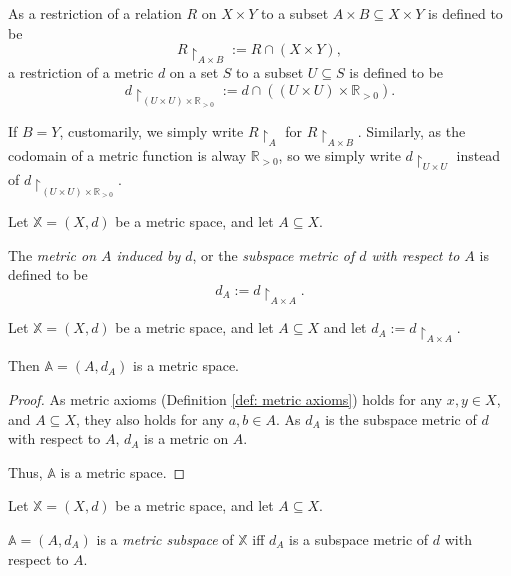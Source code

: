 As a restriction of a relation $R$ on $X \times Y$ to a subset $A \times B \subseteq X \times Y$ is defined to be
$$
R \restriction_{A \times B} := R \cap (X \times Y),
$$
a restriction of a metric $d$ on a set $S$ to a subset $U \subseteq S$ is defined to be
$$
d \restriction_{(U \times U) \times \mathbb R_{> 0}} := d \cap ((U \times U) \times \mathbb R_{> 0}).
$$

If $B = Y$, customarily, we simply write $R \restriction_{A}$ for $R \restriction_{A \times B}$. Similarly, as the codomain of a metric function is alway $\mathbb R_{> 0}$, so we simply write $d \restriction_{U \times U}$ instead of $d \restriction_{(U \times U) \times \mathbb R_{> 0}}$.


\begin{definition}
	\label{def: subspace metric}
	Let $\mathbb X = (X, d)$ be a metric space, and let $A \subseteq X$.
	
	The \textit{metric on $A$ induced by $d$}, or the \textit{subspace metric of $d$ with respect to $A$} is defined to be
	$$
	d_A := d\restriction_{A \times A}.
	$$
\end{definition}


\begin{proposition}
	Let $\mathbb X = (X, d)$ be a metric space, and let $A \subseteq X$ and let $d_A := d\restriction_{A \times A}$.
	
	Then $\mathbb A = (A, d_A)$ is a metric space.
	
	\begin{proof}		
		As metric axioms (Definition \ref{def: metric axioms}) holds for any $x,y \in X$, and $A \subseteq X$, they also holds for any $a, b \in A$. As $d_A$ is the subspace metric of $d$ with respect to $A$, $d_A$ is a metric on $A$.
		
		Thus, $\mathbb A$ is a metric space.
	\end{proof}
\end{proposition}


\begin{definition}
	\label{def: metric subspace}
	Let $\mathbb X = (X, d)$ be a metric space, and let $A \subseteq X$. 
	
	$\mathbb A = (A, d_A)$ is a \textit{metric subspace} of $\mathbb X$ iff $d_A$ is a subspace metric of $d$ with respect to $A$.
\end{definition}



